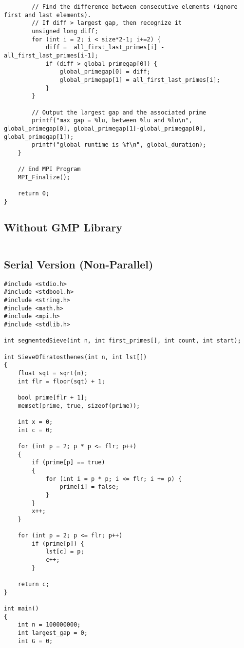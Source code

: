 \documentclass[12pt]{article}
\begin{document}
{\begin{lstlisting}
		// Find the difference between consecutive elements (ignore first and last elements).
		// If diff > largest gap, then recognize it
		unsigned long diff;
		for (int i = 2; i < size*2-1; i+=2) {
			diff =  all_first_last_primes[i] - all_first_last_primes[i-1];
			if (diff > global_primegap[0]) {
				global_primegap[0] = diff;
				global_primegap[1] = all_first_last_primes[i];
			}
		}

		// Output the largest gap and the associated prime
		printf("max gap = %lu, between %lu and %lu\n", global_primegap[0], global_primegap[1]-global_primegap[0], global_primegap[1]);
		printf("global runtime is %f\n", global_duration);
	}

	// End MPI Program
	MPI_Finalize();

	return 0;
}
    \end{lstlisting}
    \subsection{Without GMP Library}
    \begin{lstlisting}
    \end{lstlisting}

    \subsection{Serial Version (Non-Parallel)}
    \begin{lstlisting}
#include <stdio.h>
#include <stdbool.h>
#include <string.h>
#include <math.h>
#include <mpi.h>
#include <stdlib.h>

int segmentedSieve(int n, int first_primes[], int count, int start);

int SieveOfEratosthenes(int n, int lst[])
{
    float sqt = sqrt(n);
    int flr = floor(sqt) + 1;

    bool prime[flr + 1];
    memset(prime, true, sizeof(prime));

    int x = 0;
    int c = 0;

    for (int p = 2; p * p <= flr; p++)
    {
        if (prime[p] == true)
        {
            for (int i = p * p; i <= flr; i += p) {
                prime[i] = false;
            }
        }
        x++;
    }

    for (int p = 2; p <= flr; p++)
        if (prime[p]) {
            lst[c] = p;
            c++;
        }

    return c;
}

int main()
{
    int n = 100000000;
    int largest_gap = 0;
    int G = 0;


\end{lstlisting}}
\end{document}
